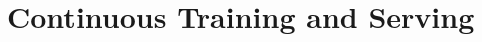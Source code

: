 \documentclass{vldb}
\begin{document}
\section{Continuous Training and Serving} \label{continious-training-serving}
\end{document}
